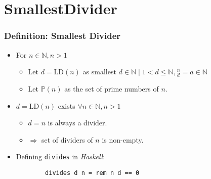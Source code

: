 \section{SmallestDivider}

\begin{frame}[fragile]
  \frametitle{Definition: Smallest Divider}
  \begin{definition}
    \begin{itemize}
      \item For $n \in \mathbb{N}, n>1$
        \begin{itemize}
          \item Let $d = \mbox{LD}(n)$ as smallest 
            $d \in \mathbb{N} \mid 1 < d \le \mathbb{N}, \frac{n}{d} = a \in \mathbb{N}$
          \item Let $\mathbb{P}(n)$ as the set of prime numbers of $n$. 
        \end{itemize}
    \end{itemize}
  \end{definition}
  \begin{itemize}
    \item $d = \mbox{LD}(n)$ exists $\forall n \in \mathbb{N}, n > 1$
      \begin{itemize}
        \item $d = n$ is always a divider.
        \item $\Rightarrow$ set of dividers of $n$ is non-empty.
      \end{itemize}  
    \item Defining {\scriptsize\texttt{divides}} in \emph{Haskell}:  
	  \begin{lstlisting}
	    divides d n = rem n d == 0
	  \end{lstlisting}
  \end{itemize}
\end{frame}

